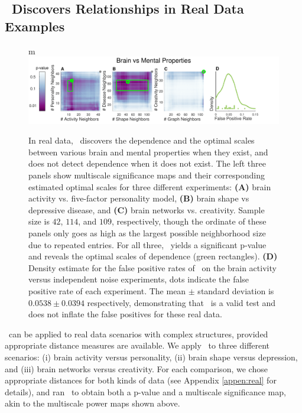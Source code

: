 \documentclass[11pt]{article}
\begin{document}
\subsection*{\Mgc~Discovers  Relationships in Real Data Examples}
\label{numer3}



\begin{figure}[!ht]
m\includegraphics[width=1.0\textwidth,trim={0 0 1.5cm 0},clip]{Figures/FigReal}
\caption{In real data, \Mgc~discovers the dependence and the optimal scales between various brain and mental properties when they exist, and does not detect dependence when it does not exist.  The left three panels show multiscale significance maps and their corresponding estimated optimal scales for three different experiments: \textbf{(A)}  brain activity vs. five-factor personality model, \textbf{(B)}  brain shape vs depressive disease, and \textbf{(C)} brain networks vs. creativity. Sample size is $42$, $114$, and $109$, respectively, though the ordinate of these panels only goes as high as the largest possible neighborhood size due to repeated entries.  
For all three, \Mgc~yields a significant p-value and reveals the optimal scales of dependence (green rectangles).
\textbf{(D)} Density estimate for the false positive rates of  \Mgc~on the brain activity versus  independent noise experiments, dots indicate the false positive rate of each experiment. The mean $\pm$ standard deviation is $0.0538 \pm 0.0394$ respectively, demonstrating that \Mgc~is a valid test and does not inflate the false positives for these real data.}
\label{f:real}
\end{figure}

\Mgc~can be applied to real data scenarios with complex structures, provided appropriate distance measures are available. We apply \Mgc~to three different scenarios: (i) brain activity versus personality, (ii) brain shape versus depression, and (iii) brain networks versus creativity.  For each comparison, we chose appropriate distances for both kinds of data (see Appendix \ref{appen:real} for details), and ran \Mgc~to obtain both a p-value and a multiscale significance map, akin to the multiscale power maps shown above. 
\end{document}
